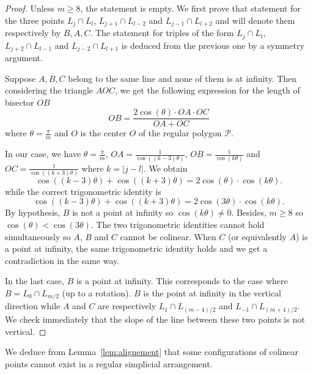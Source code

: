 \documentclass[a4paper,11pt,reqno]{amsart}
\theoremstyle{definition}
\theoremstyle{remark}
\theoremstyle{definition}
\theoremstyle{definition}
\theoremstyle{definition}
\numberwithin{equation}{section}
\begin{document}
\begin{proof}
Unless $m \geq 8$, the statement is empty. We first prove that statement for the three points $L_{j} \cap L_{l}$, $L_{j+1} \cap L_{l-2}$ and $L_{j-1} \cap L_{l+2}$ and will denote them respectively by $B,A,C$. The statement for triples of the form $L_{j} \cap L_{l}$, $L_{j+2} \cap L_{l-1}$ and $L_{j-2} \cap L_{l+1}$ is deduced from the previous one by a symmetry argument.
\par
Suppose $A,B,C$ belong to the same line and none of them is at infinity. Then considering the triangle $AOC$, we get the following expression for the length of bisector $OB$
$$OB=\frac{2 \cos(\theta) \cdot OA \cdot OC}{OA + OC}$$
where $\theta = \frac{\pi}{m}$ and $O$ is the center $O$ of the regular polygon $\mathcal{P}$.
\par
In our case, we have $\theta = \frac{\pi}{m}$, $OA = \frac{1}{\cos((k-3)\theta)}$, $OB=\frac{1}{\cos(k\theta)}$ and $OC=\frac{1}{\cos((k+3)\theta)}$ where $k =|j-l|$. We obtain
$$
\cos((k-3)\theta) + \cos((k+3)\theta) = 2\cos (\theta) \cdot \cos(k\theta).
$$
while the correct trigonometric identity is
$$
\cos((k-3)\theta) + \cos((k+3)\theta) = 2\cos (3\theta) \cdot \cos(k\theta).
$$
By hypothesis, $B$ is not a point at infinity so $\cos(k\theta) \neq 0$. Besides, $m \geq 8$ so $\cos(\theta)<\cos(3\theta)$. The two trigonometric identities cannot hold simultaneously so $A$, $B$ and $C$ cannot be colinear. When $C$ (or equivalently $A$) is a point at infinity, the same trigonometric identity holds and we get a contradiction in the same way.
\par
In the last case, $B$ is a point at infinity. This corresponds to the case where $B=L_{0} \cap L_{m/2}$ (up to a rotation). $B$ is the point at infinity in the vertical direction while $A$ and $C$ are respectively $L_{1} \cap L_{(m-4)/2}$ and $L_{-1} \cap L_{(m+4)/2}$. We check immediately that the slope of the line between these two points is not vertical.
\end{proof}

We deduce from Lemma~\ref{lem:alignement} that some configurations of colinear points cannot exist in a regular simplicial arrangement.
\end{document}
